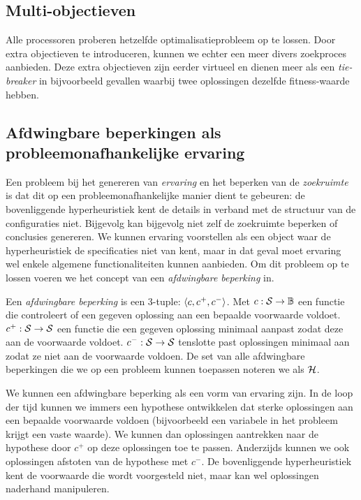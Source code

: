\subsection{Multi-objectieven}
Alle processoren proberen hetzelfde optimalisatieprobleem op te lossen. Door extra objectieven te introduceren, kunnen we echter een meer divers zoekproces aanbieden. Deze extra objectieven zijn eerder virtueel en dienen meer als een \emph{tie-breaker} in bijvoorbeeld gevallen waarbij twee oplossingen dezelfde fitness-waarde hebben.

\subsection{Afdwingbare beperkingen als probleemonafhankelijke ervaring}

Een probleem bij het genereren van \emph{ervaring} en het beperken van de \emph{zoekruimte} is dat dit op een probleemonafhankelijke manier dient te gebeuren: de bovenliggende hyperheuristiek kent de details in verband met de structuur van de configuraties niet. Bijgevolg kan bijgevolg niet zelf de zoekruimte beperken of conclusies genereren. We kunnen ervaring voorstellen als een object waar de hyperheuristiek de specificaties niet van kent, maar in dat geval moet ervaring wel enkele algemene functionaliteiten kunnen aanbieden. Om dit probleem op te lossen voeren we het concept van een \emph{afdwingbare beperking} in.

\begin{definition}
Een \emph{afdwingbare beperking} is een 3-tuple: $\left\langle c,c^+,c^-\right\rangle$. Met $c:\mathcal{S}\rightarrow\mathbb{B}$ een functie die controleert of een gegeven oplossing aan een bepaalde voorwaarde voldoet. $c^+:\mathcal{S}\rightarrow\mathcal{S}$ een functie die een gegeven oplossing minimaal aanpast zodat deze aan de voorwaarde voldoet. $c^-:\mathcal{S}\rightarrow\mathcal{S}$ tenslotte past oplossingen minimaal aan zodat ze niet aan de voorwaarde voldoen. De set van alle afdwingbare beperkingen die we op een probleem kunnen toepassen noteren we als $\mathcal{H}$.
\end{definition}

We kunnen een afdwingbare beperking als een vorm van ervaring zijn. In de loop der tijd kunnen we immers een hypothese ontwikkelen dat sterke oplossingen aan een bepaalde voorwaarde voldoen (bijvoorbeeld een variabele in het probleem krijgt een vaste waarde). We kunnen dan oplossingen aantrekken naar de hypothese door $c^+$ op deze oplossingen toe te passen. Anderzijds kunnen we ook oplossingen afstoten van de hypothese met $c^-$. De bovenliggende hyperheuristiek kent de voorwaarde die wordt voorgesteld niet, maar kan wel oplossingen naderhand manipuleren.

